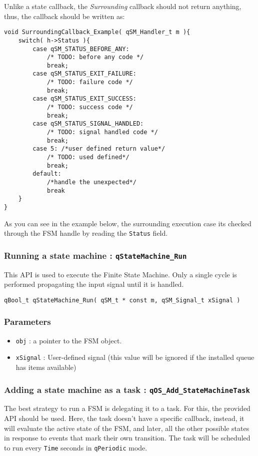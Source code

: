 Unlike a state callback, the \textit{Surrounding} callback should not return anything, thus, the callback should be written as:
\medskip

\begin{lstlisting}[style=CStyle]
void SurroundingCallback_Example( qSM_Handler_t m ){
    switch( h->Status ){
        case qSM_STATUS_BEFORE_ANY:
            /* TODO: before any code */
            break;
        case qSM_STATUS_EXIT_FAILURE:
            /* TODO: failure code */
            break;
        case qSM_STATUS_EXIT_SUCCESS:
            /* TODO: success code */
            break;
        case qSM_STATUS_SIGNAL_HANDLED:
            /* TODO: signal handled code */
            break;            
        case 5: /*user defined return value*/ 
            /* TODO: used defined*/
            break;
        default: 
            /*handle the unexpected*/
            break
    }
}
\end{lstlisting}  

As you can see in the example below, the surrounding execution case its checked through the FSM handle by reading the \lstinline{Status} field.

\subsubsection{Running a state machine : \texorpdfstring{\lstinline{qStateMachine_Run}}{qStateMachine_Run} }

This API  is used to execute the Finite State Machine. Only a single cycle is performed propagating the input signal until it is handled.
\medskip

\begin{lstlisting}[style=CStyle]
qBool_t qStateMachine_Run( qSM_t * const m, qSM_Signal_t xSignal )
\end{lstlisting}

\subsubsection*{Parameters}
\begin{itemize}
    \item \lstinline{obj} : a pointer to the FSM object.
    \item \lstinline{xSignal} :  User-defined signal (this value will be ignored if the installed queue has items available)
\end{itemize}  

\subsubsection{Adding a state machine as a task : \texorpdfstring{\lstinline{qOS_Add_StateMachineTask}}{qOS_Add_StateMachineTask} } \label{statemachinetask}
The best strategy to run a FSM is delegating it to a task. For this, the provided  API should be used. Here, the task doesn't have a specific callback, instead, it will evaluate the active state of the FSM, and later, all the other possible states in response to events that mark their own transition. The task will be scheduled to run every \lstinline{Time} seconds in \lstinline{qPeriodic} mode. 

